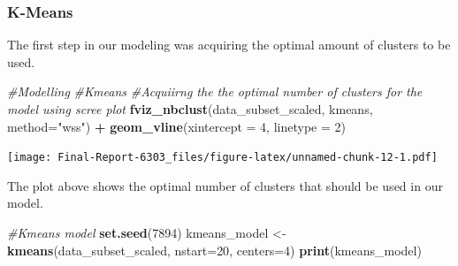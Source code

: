 \documentclass[
]{article}
\newenvironment{Shaded}{\begin{snugshade}}{\end{snugshade}}
\newcommand{\AttributeTok}[1]{\textcolor[rgb]{0.13,0.29,0.53}{#1}}
\newcommand{\CommentTok}[1]{\textcolor[rgb]{0.56,0.35,0.01}{\textit{#1}}}
\newcommand{\DecValTok}[1]{\textcolor[rgb]{0.00,0.00,0.81}{#1}}
\newcommand{\FunctionTok}[1]{\textcolor[rgb]{0.13,0.29,0.53}{\textbf{#1}}}
\newcommand{\NormalTok}[1]{#1}
\newcommand{\OtherTok}[1]{\textcolor[rgb]{0.56,0.35,0.01}{#1}}
\newcommand{\SpecialCharTok}[1]{\textcolor[rgb]{0.81,0.36,0.00}{\textbf{#1}}}
\newcommand{\StringTok}[1]{\textcolor[rgb]{0.31,0.60,0.02}{#1}}
\begin{document}
\subsubsection{K-Means}\label{k-means}

The first step in our modeling was acquiring the optimal amount of
clusters to be used.

\begin{Shaded}
\begin{Highlighting}[]
\CommentTok{\#Modelling}
\CommentTok{\#Kmeans}
\CommentTok{\#Acquiirng the the optimal number of clusters for the model using scree plot}
\FunctionTok{fviz\_nbclust}\NormalTok{(data\_subset\_scaled, kmeans, }\AttributeTok{method=}\StringTok{"wss"}\NormalTok{) }\SpecialCharTok{+}
  \FunctionTok{geom\_vline}\NormalTok{(}\AttributeTok{xintercept =} \DecValTok{4}\NormalTok{, }\AttributeTok{linetype =} \DecValTok{2}\NormalTok{)}
\end{Highlighting}
\end{Shaded}

\texttt{[image: Final-Report-6303\_files/figure-latex/unnamed-chunk-12-1.pdf]}

The plot above shows the optimal number of clusters that should be used
in our model.

\begin{Shaded}
\begin{Highlighting}[]
\CommentTok{\#Kmeans model}
\FunctionTok{set.seed}\NormalTok{(}\DecValTok{7894}\NormalTok{)}
\NormalTok{kmeans\_model }\OtherTok{\textless{}{-}} \FunctionTok{kmeans}\NormalTok{(data\_subset\_scaled, }\AttributeTok{nstart=}\DecValTok{20}\NormalTok{, }\AttributeTok{centers=}\DecValTok{4}\NormalTok{)}
\FunctionTok{print}\NormalTok{(kmeans\_model)}
\end{Highlighting}
\end{Shaded}
\end{document}
